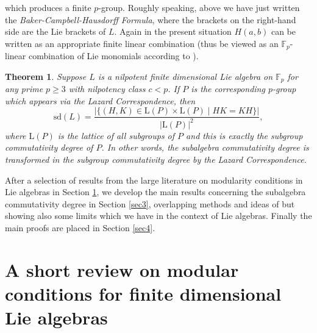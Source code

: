 \documentclass{amsart}
\newtheorem{theorem}{Theorem}[section]
\theoremstyle{definition}
\numberwithin{equation}{section}
\begin{document}
which produces a finite $p$-group. Roughly speaking, above we have just written the \textit{Baker-Campbell-Hausdorff Formula}, where the brackets on the right-hand side are the Lie brackets of $L$. Again in the present situation $H(a,b)$ can be written as an appropriate finite linear combination (thus be viewed as an $\mathbb{F}_{p}$-linear combination of Lie monomials according to \cite{lazard}). 


\begin{theorem} \label{lazardforp3} Suppose $L$ is a nilpotent finite dimensional Lie algebra on \(\mathbb{F}_{p}\) for any prime $p\ge 3$ with nilpotency class $c < p$. If $P$ is the corresponding $p$-group which appears via the Lazard Correspondence, then  $$\mathrm{sd}(L)= \frac{|\{(H,K) \in \mathrm{L}(P) \times \mathrm{L}(P) \mid HK=KH\}|}{|\mathrm{L}(P)|^2},$$ where $\mathrm{L}(P)$ is the lattice of all subgroups of $P$
and this is exactly the subgroup commutativity degree of $P$.  In other words, the subalgebra commutativity degree is transformed in the subgroup commutativity degree by the Lazard Correspondence. 
\end{theorem}

After a selection of results from the large literature on modularity conditions in Lie algebras in Section \ref{sec2}, we develop the main results concerning the subalgebra commutativity degree in Section \ref{sec3}, overlapping methods and ideas of \cite{sr1, sr2, or, mt} but showing also some limits which we have in the context of Lie algebras. Finally the main proofs are placed in Section \ref{sec4}.


\section{A short review on modular conditions for finite dimensional Lie algebras} \label{sec2}
\end{document}
